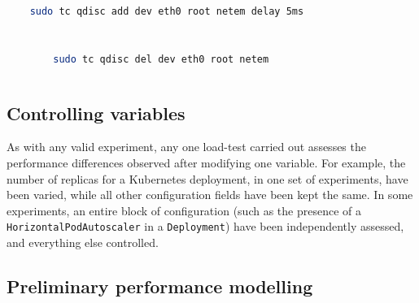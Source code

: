 \begin{center}
    \begin{minipage}{\linewidth}
    \centering
    \begin{lstlisting}[language=bash, caption={Pre-test latency simulation command},label=lst:pre-test-latency]
    
    sudo tc qdisc add dev eth0 root netem delay 5ms
    
    \end{lstlisting}
    \end{minipage}
\end{center}

\begin{center}
    \begin{minipage}{\linewidth}
    \centering
    \begin{lstlisting}[language=bash, caption={Post-test latency simulation teardown},label=lst:post-test-latency]
    
        sudo tc qdisc del dev eth0 root netem
    
    \end{lstlisting}
    \end{minipage}
\end{center}





\subsection{Controlling variables}

As with any valid experiment, any one load-test carried out assesses the performance differences observed after modifying one variable. For example, the number of replicas for a Kubernetes deployment, in one set of experiments, have been varied, while all other configuration fields have been kept the same. In some experiments, an entire block of configuration (such as the presence of a \verb|HorizontalPodAutoscaler| in a \verb|Deployment|) have been independently assessed, and everything else controlled. 

\subsection{Preliminary performance modelling}
